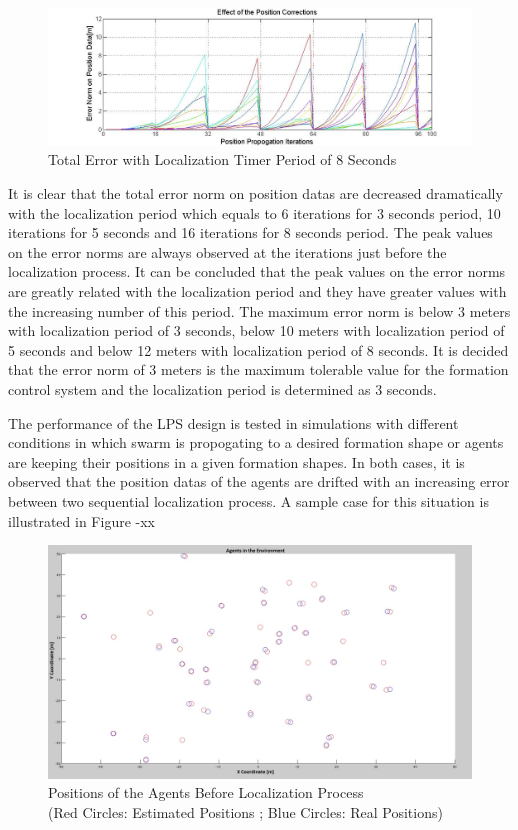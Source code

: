 \documentclass[twoside]{article}
\begin{document}
				\begin{figure}[H]
					\caption{Total Error with Localization Timer Period of 8 Seconds}
					\centerline{\includegraphics[scale = 0.4]{Error-0,5Prop-8Update}}
				\end{figure} 		
		
		
It is clear that the total error norm on position datas are decreased dramatically with the localization period which equals to 6 iterations for 3 seconds period, 10 iterations for 5 seconds and 16 iterations for 8 seconds period. The peak values on the error norms are always observed at the iterations just before the localization process. It can be concluded that the peak values on the error norms are greatly related with the localization period and they have greater values with the increasing number of this period. The maximum error norm is below 3 meters with localization period of 3 seconds, below 10 meters with localization period of 5 seconds and below 12 meters with localization period of 8 seconds. It is decided  that the error norm of 3 meters is the maximum tolerable value for the formation control system and the localization period is determined as 3 seconds. 

The performance of the LPS design is tested in simulations with different conditions in which swarm is propogating to a desired formation shape or agents are keeping their positions in a given formation shapes.  In both cases, it is observed that the position datas of the agents are drifted with an increasing error between two  sequential localization process. A sample case for this situation is illustrated in Figure -xx

	\begin{figure}[H]
		\caption{Positions of the Agents Before Localization Process \\
			       (Red Circles: Estimated Positions ; Blue Circles: Real Positions)}
		\centerline{\includegraphics[scale = 0.30]{Pozisyon-1_Hatali}}
	\end{figure} 
		
\end{document}
